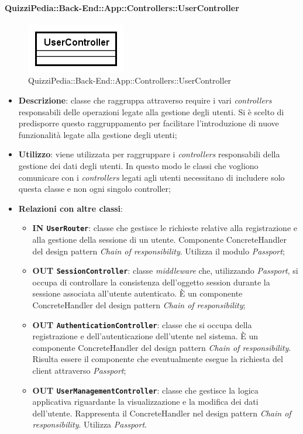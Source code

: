 \paragraph{QuizziPedia::Back-End::App::Controllers::UserController}
\label{QuizziPedia::Back-End::App::Controllers::UserController_}
\begin{figure}[ht]
	\centering
	\includegraphics[scale=0.8]{UML/Classi/Back-End/QuizziPedia_Back-End_App_Controllers_UserController.png}
	\caption{QuizziPedia::Back-End::App::Controllers::UserController}
\end{figure}
\FloatBarrier
\begin{itemize}
	\item 
	\textbf{Descrizione}:
	classe che raggruppa attraverso require i vari \textit{controllers}  responsabili delle operazioni legate alla gestione degli utenti. Si è scelto di predisporre questo raggruppamento per facilitare l'introduzione di nuove funzionalità legate alla gestione degli utenti;
	\item \textbf{Utilizzo}:
	viene utilizzata per raggruppare i \textit{controllers}  responsabili della gestione dei dati degli utenti. In questo modo le classi che vogliono comunicare con i \textit{controllers}  legati agli utenti necessitano di includere solo questa classe e non ogni singolo controller;
	\item \textbf{Relazioni con altre classi}:
	\begin{itemize}
		\item 
			\textbf{IN	\texttt{UserRouter}}: 
			classe che gestisce le richieste relative alla registrazione e alla gestione della sessione di un utente. Componente ConcreteHandler del design pattern \textit{Chain of responsibility}. Utilizza il modulo \textit{Passport};		
		\item 
			\textbf{OUT \texttt{SessionController}}:
			classe \textit{middleware} che, utilizzando \textit{Passport}, si occupa di controllare la consistenza dell'oggetto session durante la sessione associata all'utente autenticato. È un componente ConcreteHandler del design pattern \textit{Chain of responsibility};
		\item 
			\textbf{OUT \texttt{AuthenticationController}}:
			classe che si occupa della registrazione e dell'autenticazione dell'utente nel sistema. È un componente ConcreteHandler del design pattern \textit{Chain of responsibility}. Risulta essere il componente che eventualmente esegue la richiesta del client attraverso \textit{Passport};	
		\item 
			\textbf{OUT \texttt{UserManagementController}}:
			classe che gestisce la logica applicativa riguardante la visualizzazione e la modifica dei dati dell'utente.
			Rappresenta il ConcreteHandler nel design pattern \textit{Chain of responsibility}. Utilizza \textit{Passport}.
	\end{itemize}
\end{itemize}
